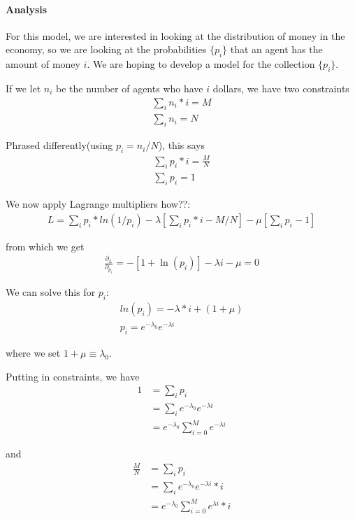 \documentclass[10 pt,final]{article}
\newcommand{\impo}[1]{{\color{magenta} #1}}
\newcommand{\question}[1]{{\color{blue} #1}}
\begin{document}
\paragraph{Analysis} For this model, we are interested in looking at the distribution of money in the economy, so we are looking at the probabilities $\{p_i\}$ that an agent has the amount of money $i$. We are hoping to develop a model for the collection $\{p_i\}$.

If we let $n_i$ be the number of agents who have $i$ dollars, we have two constraints
\begin{align*}
\sum_i n_i * i = M \\
\sum_i n_i = N
\end{align*}

Phrased differently(using $p_i = n_i/N$), this says 
\begin{align*}
\sum_i p_i*i = \frac{M}{N} \\
\sum_i p_i = 1
\end{align*}

We now apply \impo{Lagrange multipliers} \question{how??}:
\begin{align*}
L = \sum_i p_i * ln(1/p_i) - \lambda[\sum_i p_i*i - M/N] - \mu [\sum_i p_i -1]
\end{align*}

from which we get
\begin{align*}
\frac{\partial_L}{\partial_{p_i}} = -[1+\ln(p_i)] - \lambda i - \mu = 0
\end{align*}

We can solve this for $p_i$:
\begin{align*}
ln(p_i) = -\lambda *i + (1+\mu) \\
p_i = e^{-\lambda_0} e^{-\lambda i}
\end{align*}

where we set $1+\mu \equiv \lambda_0$.

\impo{Putting in constraints}, we have
\begin{align*}
1 & = \sum_i p_i \\
& = \sum_i e^{-\lambda_0} e^{-\lambda i} \\
& = e^{-\lambda_0} \sum^M_{i=0} e^{-\lambda i}
\end{align*}

and 
\begin{align*}
\frac{M}{N} & = \sum_i p_i \\
& = \sum_i e^{-\lambda_0}e^{-\lambda i} * i \\
& = e^{-\lambda_0} \sum^M_{i=0}e^{\lambda i} *i
\end{align*}
\end{document}
